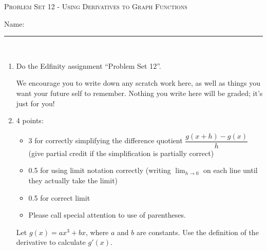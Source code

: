 \documentclass{article}
\newcommand{\doedfinity}[2][\newpage]{
  \begin{problem}[#1]
    Do the Edfinity assignment ``Problem Set #2''.

    We encourage you to write down any scratch work here, as well as
    things you want your future self to remember. Nothing you write
    here will be graded; it's just for you!
  \end{problem}
}
\begin{document}
\begin{center}
  \large\textsc{Problem Set 12 - Using Derivatives to Graph Functions}\vspace{.5in}\\
  \begin{problemonly}
   \large Name: \rule{5cm}{0.15mm}\\
   \end{problemonly}
\end{center}

\begin{enumerate}
\item  {}

  \doedfinity{12}

\item \label{deriv-of-ax^3+bx}

  \begin{grading} 
    4 points:
    \begin{itemize}[nosep]
    \item 3 for correctly simplifying the difference quotient $\dfrac{ g(x+h) - g(x) }{h}$ (give partial credit if the simplification is partially correct)
    \item 0.5 for using limit notation correctly (writing $\displaystyle \lim_{h \to 0}$ on each line until they actually take the limit)
    \item 0.5 for correct limit
    \item Please call special attention to use of parentheses.
    \end{itemize}
  \end{grading} 

  \begin{problem}[\vfill]
    Let $g(x) = ax^3 + bx$, where $a$ and $b$ are constants. Use the definition of the derivative to calculate $g'(x)$. 
  \end{problem}


\end{enumerate}
\end{document}
